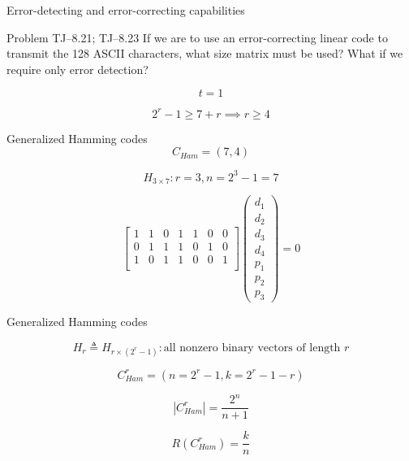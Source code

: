 \begin{frame}{Error-detecting and error-correcting capabilities}
  \begin{exampleblock}{Problem TJ--8.21; TJ--8.23}
	If we are to use an error-correcting linear code to transmit the 128 ASCII characters,
	what size matrix must be used? What if we require only error detection?
  \end{exampleblock}

  \[
	t = 1
  \]

  \[
	2^r - 1 \ge 7 + r \implies r \ge 4
  \]
\end{frame}
\begin{frame}{Generalized Hamming codes}
  \[
	C_{Ham} = (7,4)
  \]

  \[
	H_{3 \times 7}: r = 3, n = 2^3 - 1 = 7
  \]

  \[
	\begin{bmatrix}
	  1 & 1 & 0 & 1 & 1 & 0 & 0 \\
	  0 & 1 & 1 & 1 & 0 & 1 & 0 \\
	  1 & 0 & 1 & 1 & 0 & 0 & 1 \\
	\end{bmatrix} \begin{pmatrix}
      d_1 \\ d_2 \\ d_3 \\ d_4 \\ p_1 \\ p_2 \\ p_3
	\end{pmatrix}
	= 0
  \]
\end{frame}
\begin{frame}{Generalized Hamming codes}
  \begin{definition}
	\[
	  H_r \triangleq H_{r \times (2^r-1)}: \text{all nonzero binary vectors of length } r
	\]

	\[
	  C_{Ham}^{r} = (n = 2^r-1, k = 2^r-1-r)
	\]
  \end{definition}

  \[
	|C_{Ham}^{r}| = \frac{2^n}{n+1}
  \]

  \[
	R(C_{Ham}^{r}) = \frac{k}{n}
  \]
\end{frame}
\tx{}
